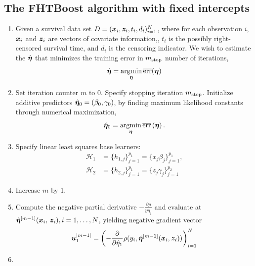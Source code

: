 \begin{algorithm}
\section{The FHTBoost algorithm with fixed intercepts}
\label{algo:fhtboost}
\begin{enumerate}
    \item
        Given a survival data set $D=(\bm{x}_i, \bm{z}_i, t_i,d_i)_{i=1}^N$, where for each observation $i$,
        $\bm{x}_i$ and $\bm{z}_i$ are vectors of covariate information,, $t_i$ is the possibly right-censored survival time, and $d_i$ is the censoring indicator.
        We wish to estimate the $\hat{\boldsymbol{\eta}}$ that minimizes the training error in $m_{\text{stop}}$ number of iterations,
        \begin{equation*}
            \hat{\boldsymbol{\eta}}=\operatorname*{argmin}_{\boldsymbol{\eta}}\overline{\text{err}}(\boldsymbol{\eta})
        \end{equation*}
    \item
        Set iteration counter $m$ to $0$.
        Specify stopping iteration $m_{\text{stop}}$.
        Initialize additive predictors $\hat{\boldsymbol{\eta}}_0=\left(\beta_{0},\gamma_{0}\right)$, by finding maximum likelihood constants through numerical maximization,
        \begin{equation*}
            \hat{\boldsymbol{\eta}}_0=\operatorname*{argmin}_{\boldsymbol{\eta}}\overline{\text{err}}\left(\boldsymbol{\eta}\right).
        \end{equation*}
    \item
    \label{algostep:FHT-base-learner}
        Specify linear least squares base learners:
        \begin{align*}
            \mathcal{H}_1&=\{h_{1,j}\}_{j=1}^{p_1}=\{x_j\beta_j\}_{j=1}^{p_1}, \\
            \mathcal{H}_2&=\{h_{2,j}\}_{j=1}^{p_1}=\{z_j\gamma_j\}_{j=1}^{p_2}
        \end{align*}
    \item
    \label{algostep:FHT-init}
        Increase $m$ by 1.
    \item
        Compute the negative partial derivative $-\frac{\partial\rho}{\partial \hat{\eta}_1}$
        and evaluate at $\hat{\boldsymbol{\eta}}^{[m-1]}(\bm{x}_i,\,\bm{z}_i),i=1,\ldots,N$, yielding negative gradient vector
        \begin{equation*}
            \bm{u}^{[m-1]}_1=\left(-\frac{\partial}{\partial \hat{\eta}_1}\rho(y_i, \hat{\boldsymbol{\eta}}^{[m-1]}(\bm{x}_i,\bm{z}_i))\right)_{i=1}^N
        \end{equation*}
    \item

\end{enumerate}
\end{algorithm}

